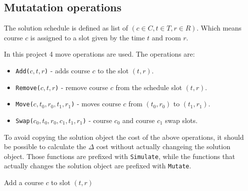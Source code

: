 \subsection{Mutatation operations}
\label{sec:mutate-operations}

The solution schedule is defined as list of $(c \in C, t \in T, r \in R)$. Which means course $c$ is assigned to a slot given by the time $t$ and room $r$.

In this project 4 move operations are used. The operations are:
\begin{itemize}
\item \texttt{Add($c, t, r$)} - adds course $c$ to the slot $(t, r)$.  
\item \texttt{Remove($c, t, r$)} - remove course $c$ from the schedule slot $(t, r)$.
\item \texttt{Move($c, t_0, r_0, t_1, r_1$)} - moves course $c$ from $(t_0, r_0)$ to $(t_1, r_1)$.
\item \texttt{Swap($c_0, t_0, r_0, c_1, t_1, r_1$)} - course $c_0$ and course $c_1$ swap slots.
\end{itemize}

To avoid copying the solution object the cost of the above operations, it should be possible to calculate the $\Delta$ cost without actually changeing the solution object. Those functions are prefixed with \texttt{Simulate}, while the functions that actually changes the solution object are prefixed with \texttt{Mutate}.

\begin{algorithm}[H]
  \caption{Add a course $c$ to slot $(t, r)$}
  \begin{algorithmic}[1]
       
          \State {}
      \EndIf
      \State {} 
    \EndFunction
    
    \Statex
             
        \EndIf
    \EndFunction
  \end{algorithmic}
\end{algorithm}


